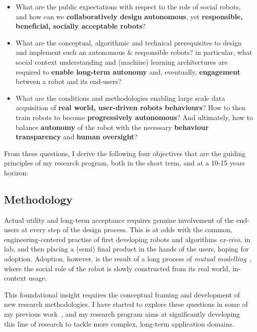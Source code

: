 \vspace{0.5em}
\begin{itemize}
    \item What are the public expectations with respect to the role of social
        robots, and how can we \textbf{collaboratively design}
        \textbf{autonomous}, yet \textbf{responsible, beneficial, socially
        acceptable robots}?

    \item What are the conceptual, algorithmic and technical prerequisites to
        design and implement such an autonomous \& responsible robots? in
        particular, what social context understanding and (machine) learning
        architectures are required to \textbf{enable long-term autonomy} and,
        eventually, \textbf{engagement} between a robot and its end-users?

    \item What are the conditions and methodologies enabling large scale data
        acquisition of \textbf{real world, user-driven robots behaviours}? How
        to then train robots to become \textbf{progressively autonomous}?  And
        ultimately, how to balance \textbf{autonomy} of the robot with the
        necessary \textbf{behaviour transparency} and \textbf{human oversight}?

\end{itemize}

\vspace{0.5em}
\noindent From these questions, I derive the following four objectives that are
the guiding principles of my research program, both in the short term, and at a
10-15 years horizon:

\subsection{Methodology}

Actual utility and long-term acceptance requires genuine involvement of the
end-users at every step of the design process. This is at odds with the common,
engineering-centered practise of first developing robots and algorithms \emph{ex-vivo}, in
lab, and then placing a (semi) final product in the hands of the users, hoping
for adoption. Adoption, however, is the result of a long process of \emph{mutual
modelling}~\autocite{sabanovic2010robots}, where
the social role of the robot is slowly constructed from its real world, in-context
usage.

This foundational insight requires the conceptual framing and development of new
research methodologies.  I have started to explore these questions in some of my
previous work~\autocite{senft2016sparc,winkle2019effective,winkle2021leador},
and my research program aims at significantly developing this line of research
to tackle more complex, long-term application domains.

